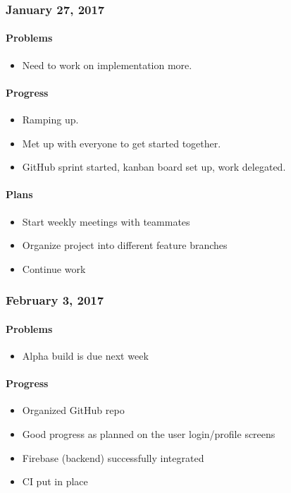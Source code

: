 \subsubsection{January 27, 2017}\label{section}
\paragraph{Problems}\label{problems}
\begin{itemize}
\tightlist
\item
  Need to work on implementation more.
\end{itemize}
\paragraph{Progress}\label{progress}
\begin{itemize}
\tightlist
\item
  Ramping up.
\item
  Met up with everyone to get started together.
\item
  GitHub sprint started, kanban board set up, work delegated.
\end{itemize}
\paragraph{Plans}\label{plans}
\begin{itemize}
\tightlist
\item
  Start weekly meetings with teammates
\item
  Organize project into different feature branches
\item
  Continue work
\end{itemize}

\subsubsection{February 3, 2017}\label{section}
\paragraph{Problems}\label{problems}
\begin{itemize}
\tightlist
\item
  Alpha build is due next week
\end{itemize}
\paragraph{Progress}\label{progress}
\begin{itemize}
\tightlist
\item
  Organized GitHub repo
\item
  Good progress as planned on the user login/profile screens
\item
  Firebase (backend) successfully integrated
\item
  CI put in place
\end{itemize}
